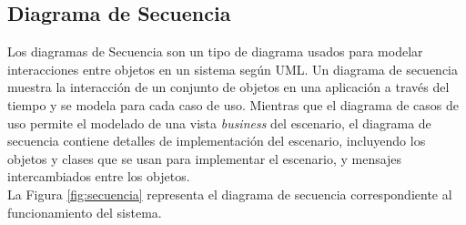 		\subsection{Diagrama de Secuencia}
			
			Los diagramas de Secuencia son un tipo de diagrama usados para modelar interacciones entre objetos en un sistema según UML. Un diagrama de secuencia muestra la interacción de un conjunto de objetos en una aplicación a través del tiempo y se modela para cada caso de uso. Mientras que el diagrama de casos de uso permite el modelado de una vista \textit{business} del escenario, el diagrama de secuencia contiene detalles de implementación del escenario, incluyendo los objetos y clases que se usan para implementar el escenario, y mensajes intercambiados entre los objetos.\\

			La Figura \ref{fig:secuencia} representa el diagrama de secuencia correspondiente al funcionamiento del sistema.
			
